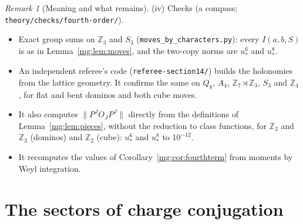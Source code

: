 \documentclass[11pt,a4paper]{article}
\theoremstyle{definition}
\theoremstyle{remark}
\newtheorem{remark}[theorem]{Remark}
\newcommand{\norm}[1]{\lVert #1\rVert}
\begin{document}
\begin{remark}[Meaning and what remains]
(iv) Checks (a compass; \texttt{theory/checks/fourth-order/}).
\begin{itemize}
\item Exact group sums on $\mathbb Z_3$ and $S_3$ (\texttt{moves\_by\_characters.py}): every $I(a,b,S)$ is as in Lemma~\ref{mg:lem:moves}, and the two-copy norms are $u_*^6$
and $u_*^8$.
\item An independent referee's code (\texttt{referee-section14/}) builds the holonomies from the lattice geometry. It confirms the same on $Q_8$, $A_4$,
$\mathbb Z_7\rtimes\mathbb Z_3$, $S_3$ and $\mathbb Z_4$, for flat and bent dominos and both cube moves.
\item It also computes $\norm{P^JO_JP^J}$ directly from the definitions of Lemma~\ref{mg:lem:pieces}, without the reduction to class functions, for $\mathbb Z_2$ and
$\mathbb Z_3$ (dominos) and $\mathbb Z_2$ (cube): $u_*^6$ and $u_*^8$ to $10^{-12}$.
\item It recomputes the values of Corollary~\ref{mg:cor:fourthterm} from moments by Weyl integration.
\end{itemize}
\end{remark}

\section{The sectors of charge conjugation}\label{mg:sec:codd}
\end{document}
